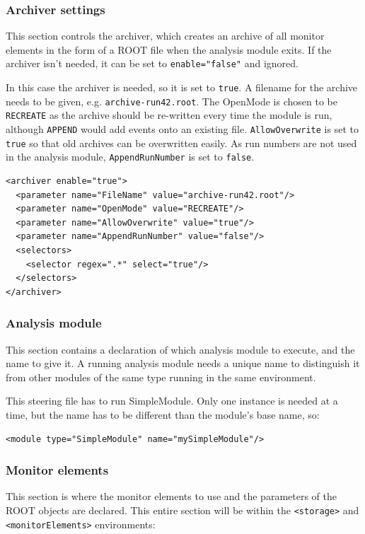 \subsubsection{Archiver settings}
This section controls the archiver, which creates an archive of all monitor elements in the form of a ROOT file when the analysis module exits. If the archiver isn't needed, it can be set to \texttt{enable="false"} and ignored.

In this case the archiver is needed, so it is set to \texttt{true}. A filename for the archive needs to be given, e.g. \texttt{archive-run42.root}. The OpenMode is chosen to be \texttt{RECREATE} as the archive should be re-written every time the module is run, although \texttt{APPEND} would add events onto an existing file. \texttt{AllowOverwrite} is set to \texttt{true} so that old archives can be overwritten easily. As run numbers are not used in the analysis module, \texttt{AppendRunNumber} is set to \texttt{false}.

\begin{lstlisting}
<archiver enable="true">
  <parameter name="FileName" value="archive-run42.root"/>
  <parameter name="OpenMode" value="RECREATE"/>
  <parameter name="AllowOverwrite" value="true"/>
  <parameter name="AppendRunNumber" value="false"/>
  <selectors>
    <selector regex=".*" select="true"/>
  </selectors>
</archiver>
\end{lstlisting}

\subsubsection{Analysis module}
This section contains a declaration of which analysis module to execute, and the name to give it. A running analysis module needs a unique name to distinguish it from other modules of the same type running in the same environment.

This steering file has to run SimpleModule. Only one instance is needed at a time, but the name has to be different than the module's base name, so:

\begin{lstlisting}
<module type="SimpleModule" name="mySimpleModule"/>
\end{lstlisting}

\subsubsection{Monitor elements}
This section is where the monitor elements to use and the parameters of the ROOT objects are declared. This entire section will be within the \texttt{<storage>} and \texttt{<monitorElements>} environments:

